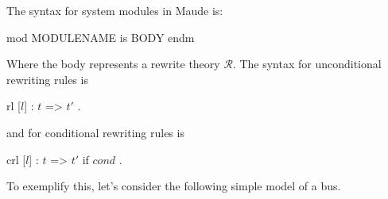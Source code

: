 The syntax for system modules in Maude is:
\\
\begin{maude}
mod MODULENAME is
    BODY
endm
\end{maude}
Where the body represents a rewrite theory $\mathscr{R}$. The syntax for unconditional rewriting rules is
\\
\begin{maude}
rl [$l$] : $t$ => $t'$ .
\end{maude}
and for conditional rewriting rules is
\\
\begin{maude}
crl [$l$] : $t$ => $t'$ if $cond$ .
\end{maude}
To exemplify this, let's consider the following simple model of a bus.

